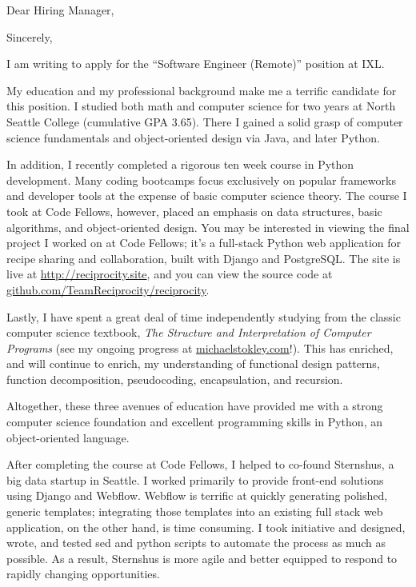 \documentclass[10pt,a4paper,sans]{moderncv}        %
\begin{document}
\date{\today{}}
\opening{Dear Hiring Manager,}
\closing{Sincerely,}
\makelettertitle

I am writing to apply for the ``Software Engineer (Remote)'' position at IXL.

My education and my professional background make me a terrific candidate for
this position. I studied both math and computer science for two years at North
Seattle College (cumulative GPA 3.65). There I gained a solid grasp of computer
science fundamentals and object-oriented design via Java, and later Python.

In addition, I recently completed a rigorous ten week course in Python
development. Many coding bootcamps focus exclusively on popular frameworks and
developer tools at the expense of basic computer science theory. The course I
took at Code Fellows, however, placed an emphasis on data structures, basic
algorithms, and object-oriented design. You may be interested in viewing the
final project I worked on at Code Fellows; it's a full-stack Python web
application for recipe sharing and collaboration, built with Django and
PostgreSQL. The site is live at
{\href{http://reciprocity.site.}{http://reciprocity.site}}, and you can view the
source code at
{\href{http://github.com/TeamReciprocity/reciprocity}{github.com/TeamReciprocity/reciprocity}}.

Lastly, I have spent a great deal of time independently studying from the
classic computer science textbook, \textit{The Structure and Interpretation of
  Computer Programs} (see my ongoing progress at
{\href{http://michaelstokley.com}{michaelstokley.com}}!). This has enriched, and
will continue to enrich, my understanding of functional design patterns,
function decomposition, pseudocoding, encapsulation, and recursion.

Altogether, these three avenues of education have provided me with a strong
computer science foundation and excellent programming skills in Python, an
object-oriented language.

After completing the course at Code Fellows, I helped to co-found Sternshus, a
big data startup in Seattle. I worked primarily to provide front-end solutions
using Django and Webflow. Webflow is terrific at quickly generating polished,
generic templates; integrating those templates into an existing full stack web
application, on the other hand, is time consuming. I took initiative and
designed, wrote, and tested sed and python scripts to automate the process as
much as possible. As a result, Sternshus is more agile and better equipped to
respond to rapidly changing opportunities.
\end{document}
